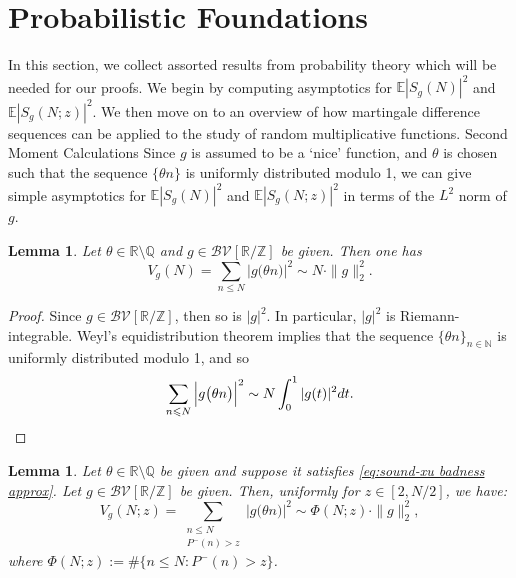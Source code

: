 \documentclass[12pt]{amsart}
\makeatletter
\renewcommand\subsection{\@startsection{subsection}{2}%
	\z@{1\linespacing\@plus1\linespacing}{\linespacing}%
	{\normalfont\bfseries\centering}}
\renewcommand{\leq}{\leqslant}
\numberwithin{equation}{section}
\theoremstyle{plain}
\newtheorem{lem}[thm]{Lemma}
\theoremstyle{definition}
\newcommand{\N}{\mathbb{N}}
\newcommand{\Z}{\mathbb{Z}}
\newcommand{\Q}{\mathbb{Q}}
\newcommand{\R}{\mathbb{R}}
\newcommand{\E}{\mathbb{E}}
\newcommand{\CB}{\mathcal{B}}
\newcommand{\CV}{\mathcal{V}}
\makeatother
\begin{document}
	
	
	\section{Probabilistic Foundations}
	In this section, we collect assorted results from probability theory which will be needed for our proofs. We begin by computing asymptotics for $\E|S_g(N)|^2$ and $\E|S_g(N;z)|^2$. We then move on to an overview of how martingale difference sequences can be applied to the study of random multiplicative functions.
	\subsection{Second Moment Calculations}
	Since $g$ is assumed to be a `nice' function, and $\theta$ is chosen such that the sequence $\{\theta n\}$ is uniformly distributed modulo 1, we can give simple asymptotics for $\E|S_g(N)|^2$ and $\E|S_g(N;z)|^2$ in terms of the $L^2$ norm of $g$.
	\begin{lem}\label{lem: variance estimate 1}
		Let $\theta \in \R\setminus \Q$ and $g \in  \CB\CV[\R/\Z]$ be given. Then one has
		$$V_{g}(N) = \sum_{n \leq N}\Big|g\big(\theta n\big)\Big|^2 \sim N \cdot \|g\|_2^2.$$
	\end{lem}
	\begin{proof}
		Since $g \in \CB\CV[\R/\Z]$, then so is $|g|^2$. In particular, $|g|^2$ is Riemann-integrable. Weyl's equidistribution theorem implies that the sequence $\{\theta n\}_{n \in \N}$ is uniformly distributed modulo 1, and so
		$$
		\sum_{n \leq N}\Big|g\big(\theta n\big)\Big|^2 \sim N \int_0^1 |g(t)|^2dt. \qedhere
		$$
	\end{proof}
	\begin{lem}\label{lem: variance estimate 2}
		Let $\theta \in \R\setminus \Q$ be given and suppose it satisfies \eqref{eq:sound-xu badness approx}. Let $g \in \CB\CV[\R/\Z]$ be given. Then, uniformly for $z \in [2,N/2]$, we have:
		$$V_{g}(N;z) = \sum_{\substack{n \leq N \\ P^-(n) >z}}\Big|g\big(\theta n\big)\Big|^2 \sim \Phi(N;z) \cdot \| g\|_2^2,$$
		where $\Phi(N;z) := \#\{n \leq N : P^-(n) > z\}$.
	\end{lem}
\end{document}
